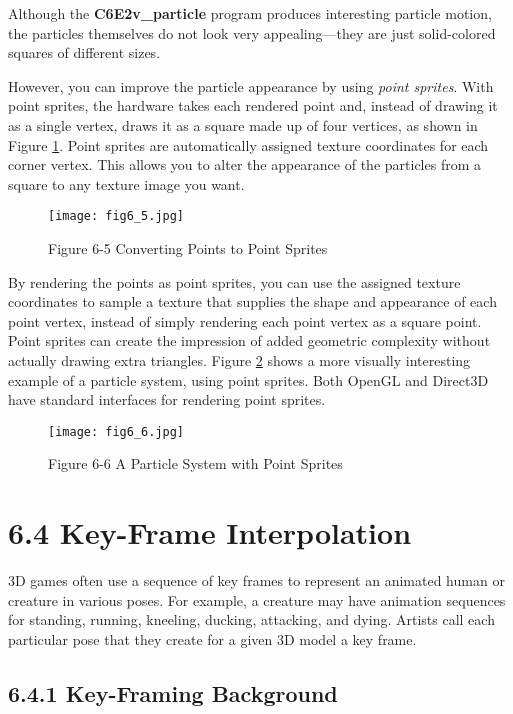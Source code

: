 \documentclass[../main.tex]{subfiles}
\begin{document}
Although the \textbf{C6E2v_particle} program produces interesting particle motion, the particles themselves do not look very appealing—they are just solid-colored squares of different sizes.

However, you can improve the particle appearance by using \textit{point sprites}. With point sprites, the hardware takes each rendered point and, instead of drawing it as a single vertex, draws it as a square made up of four vertices, as shown in Figure \ref{fig:6-5}. Point sprites are automatically assigned texture coordinates for each corner vertex. This allows you to alter the appearance of the particles from a square to any texture image you want.

\begin{figure}
    \centering
    \texttt{[image: fig6\_5.jpg]}
    \caption{Figure 6-5 Converting Points to Point Sprites}
    \label{fig:6-5}
\end{figure}

By rendering the points as point sprites, you can use the assigned texture coordinates to sample a texture that supplies the shape and appearance of each point vertex, instead of simply rendering each point vertex as a square point. Point sprites can create the impression of added geometric complexity without actually drawing extra triangles. Figure \ref{fig:6-6} shows a more visually interesting example of a particle system, using point sprites. Both OpenGL and Direct3D have standard interfaces for rendering point sprites.

\begin{figure}
    \centering
    \texttt{[image: fig6\_6.jpg]}
    \caption{Figure 6-6 A Particle System with Point Sprites}
    \label{fig:6-6}
\end{figure}

\section{6.4 Key-Frame Interpolation}

3D games often use a sequence of key frames to represent an animated human or creature in various poses. For example, a creature may have animation sequences for standing, running, kneeling, ducking, attacking, and dying. Artists call each particular pose that they create for a given 3D model a key frame.

\subsection{6.4.1 Key-Framing Background}
\end{document}
